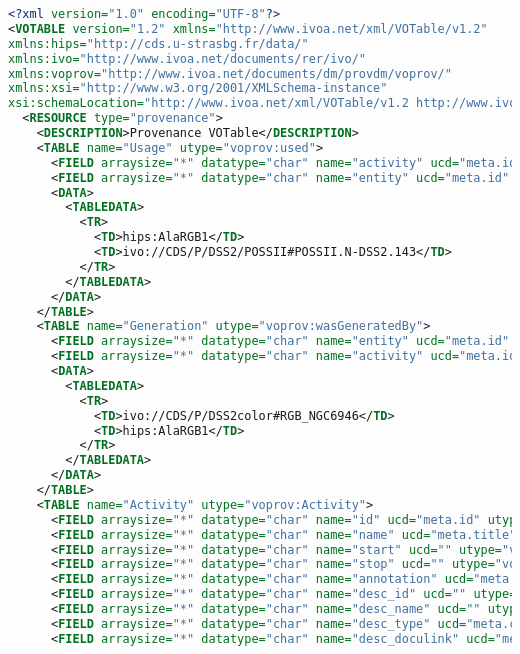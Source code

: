 \begin{lstlisting}[language=XML, caption= PROV-VOTABLE serialisation example for a Color composition Activity]
<?xml version="1.0" encoding="UTF-8"?>
<VOTABLE version="1.2" xmlns="http://www.ivoa.net/xml/VOTable/v1.2" 
xmlns:hips="http://cds.u-strasbg.fr/data/" 
xmlns:ivo="http://www.ivoa.net/documents/rer/ivo/" 
xmlns:voprov="http://www.ivoa.net/documents/dm/provdm/voprov/" 
xmlns:xsi="http://www.w3.org/2001/XMLSchema-instance" 
xsi:schemaLocation="http://www.ivoa.net/xml/VOTable/v1.2 http://www.ivoa.net/xml/VOTable/VOTable-1.2.xsd">
  <RESOURCE type="provenance">
    <DESCRIPTION>Provenance VOTable</DESCRIPTION>
    <TABLE name="Usage" utype="voprov:used">
      <FIELD arraysize="*" datatype="char" name="activity" ucd="meta.id" utype="voprov:Usage.activity"/>
      <FIELD arraysize="*" datatype="char" name="entity" ucd="meta.id" utype="voprov:Usage.entity"/>
      <DATA>
        <TABLEDATA>
          <TR>
            <TD>hips:AlaRGB1</TD>
            <TD>ivo://CDS/P/DSS2/POSSII#POSSII.N-DSS2.143</TD>
          </TR>
        </TABLEDATA>
      </DATA>
    </TABLE>
    <TABLE name="Generation" utype="voprov:wasGeneratedBy">
      <FIELD arraysize="*" datatype="char" name="entity" ucd="meta.id" utype="voprov:Generation.entity"/>
      <FIELD arraysize="*" datatype="char" name="activity" ucd="meta.id" utype="voprov:Generation.activity"/>
      <DATA>
        <TABLEDATA>
          <TR>
            <TD>ivo://CDS/P/DSS2color#RGB_NGC6946</TD>
            <TD>hips:AlaRGB1</TD>
          </TR>
        </TABLEDATA>
      </DATA>
    </TABLE>
    <TABLE name="Activity" utype="voprov:Activity">
      <FIELD arraysize="*" datatype="char" name="id" ucd="meta.id" utype="voprov:Activity.id"/>
      <FIELD arraysize="*" datatype="char" name="name" ucd="meta.title" utype="voprov:Activity.name"/>
      <FIELD arraysize="*" datatype="char" name="start" ucd="" utype="voprov:Activity.startTime"/>
      <FIELD arraysize="*" datatype="char" name="stop" ucd="" utype="voprov:Activity.endTime"/>
      <FIELD arraysize="*" datatype="char" name="annotation" ucd="meta.description" utype="voprov:Activity.annotation"/>
      <FIELD arraysize="*" datatype="char" name="desc_id" ucd="" utype="voprov:ActivityDescription.id"/>
      <FIELD arraysize="*" datatype="char" name="desc_name" ucd="" utype="voprov:ActivityDescription.name"/>
      <FIELD arraysize="*" datatype="char" name="desc_type" ucd="meta.code.class" utype="voprov:ActivityDescription.type"/>
      <FIELD arraysize="*" datatype="char" name="desc_doculink" ucd="meta.ref.url" utype="voprov:ActivityDescription.doculink"/>

\end{lstlisting}
